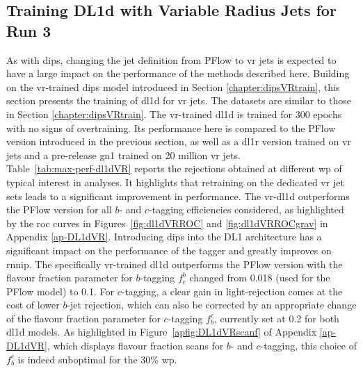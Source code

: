\subsection{Training DL1d with Variable Radius Jets for Run 3}\label{sec:VRdl1dTrain}
As with \gls{dips}, changing the jet definition from PFlow to \gls{vr} jets is expected to have a large impact on the performance of the methods described here. Building on the \gls{vr}-trained \gls{dips} model introduced in Section \ref{chapter:dipsVRtrain}, this section presents the training of \gls{dl1d} for \gls{vr} jets. The datasets are similar to those in Section \ref{chapter:dipsVRtrain}. The \gls{vr}-trained \gls{dl1d} is trained for 300 epochs with no signs of overtraining. Its performance here is compared to the PFlow version introduced in the previous section, as well as a \gls{dl1r} version trained on \gls{vr} jets and a pre-release \gls{gn1} trained on 20 million \gls{vr} jets. \\

Table~\ref{tab:max-perf-dl1dVR} reports the rejections obtained at different \gls{wp} of typical interest in analyses. It highlights that retraining on the dedicated \gls{vr} jet sets leads to a significant improvement in performance. The \gls{vr}-\gls{dl1d} outperforms the PFlow version for all $b$- and $c$-tagging efficiencies considered, as highlighted by the \gls{roc} curves in Figures~\ref{fig:dl1dVRROC} and \ref{fig:dl1dVRROCgrav} in Appendix \ref{ap-DL1dVR}. Introducing \gls{dips} into the DL1 architecture has a significant impact on the performance of the tagger and greatly improves on \gls{rnnip}. The specifically \gls{vr}-trained \gls{dl1d} outperforms the PFlow version with the flavour fraction parameter for $b$-tagging $f^b_c$ changed from 0.018 (used for the PFlow model) to 0.1. For $c$-tagging, a clear gain in light-rejection comes at the cost of lower $b$-jet rejection, which can also be corrected by an appropriate change of the flavour fraction parameter for $c$-tagging $f^c_b$, currently set at 0.2 for both \gls{dl1d} models. As highlighted in Figure~\ref{apfig:DL1dVRscanf} of Appendix \ref{ap-DL1dVR}, which displays flavour fraction scans for $b$- and $c$-tagging, this choice of $f^c_b$ is indeed suboptimal for the 30\% \gls{wp}. \\

